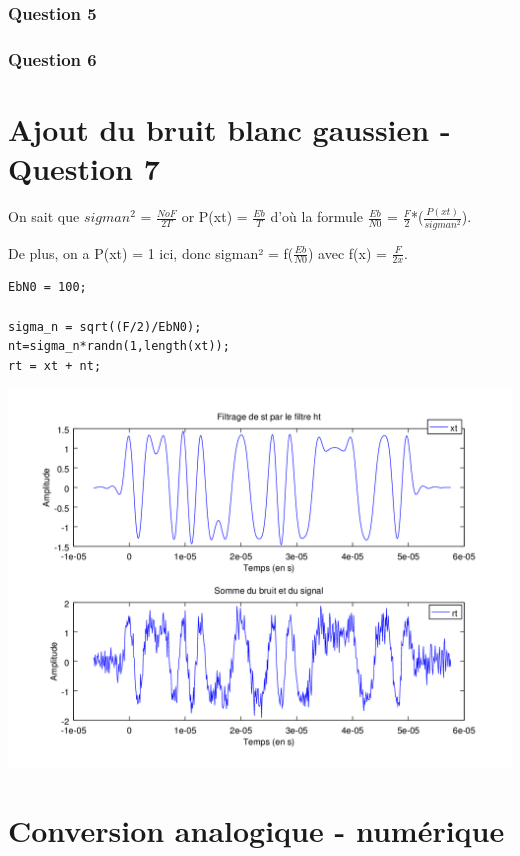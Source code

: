 \documentclass{acm_proc_article-sp}
\begin{document}
\subsubsection{Question 5}

\subsubsection{Question 6}


\section{Ajout du bruit blanc gaussien - Question 7}

On sait que $sigman^{2}$ = $\frac{NoF}{2T}$
or P(xt) = $\frac{Eb}{T}$ d'où la formule $\frac{Eb}{N0}$ = $\frac{F}{2}$*($\frac{P(xt)}{sigman^{2}}$).



De plus, on a P(xt) = 1 ici, donc sigman² = f($\frac{Eb}{N0}$) avec f(x) = $\frac{F}{2x}$.

\begin{center}
\begin{lstlisting}
EbN0 = 100;

sigma_n = sqrt((F/2)/EbN0);
nt=sigma_n*randn(1,length(xt));
rt = xt + nt;
\end{lstlisting}

\includegraphics[scale=0.45]{signalBruite_7.png}
\end{center}


\section{Conversion analogique - numérique}
\end{document}
